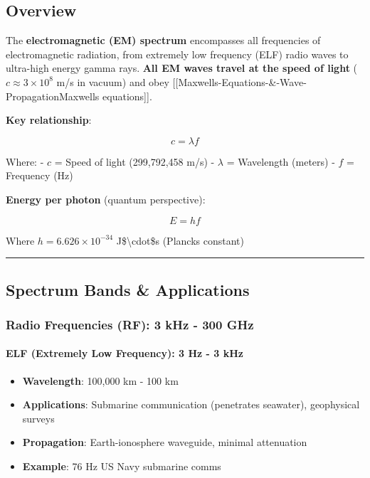 \subsection{Overview}\label{overview}

The \textbf{electromagnetic (EM) spectrum} encompasses all frequencies
of electromagnetic radiation, from extremely low frequency (ELF) radio
waves to ultra-high energy gamma rays. \textbf{All EM waves travel at
the speed of light} (\(c \approx 3 \times 10^8\) m/s in vacuum) and obey
{[}{[}Maxwell\textquotesingle s-Equations-\&-Wave-Propagation\textbar Maxwell\textquotesingle s
equations{]}{]}.

\textbf{Key relationship}:

\[
c = \lambda f
\]

Where: - \(c\) = Speed of light (299,792,458 m/s) - \(\lambda\) =
Wavelength (meters) - \(f\) = Frequency (Hz)

\textbf{Energy per photon} (quantum perspective):

\[
E = h f
\]

Where \(h = 6.626 \times 10^{-34}\) J\$\textbackslash cdot\$s
(Planck\textquotesingle s constant)

\begin{center}\rule{0.5\linewidth}{0.5pt}\end{center}

\subsection{Spectrum Bands \&
Applications}\label{spectrum-bands-applications}

\subsubsection{Radio Frequencies (RF): 3 kHz - 300
GHz}\label{radio-frequencies-rf-3-khz---300-ghz}

\paragraph{\texorpdfstring{\textbf{ELF (Extremely Low Frequency): 3 Hz -
3
kHz}}{ELF (Extremely Low Frequency): 3 Hz - 3 kHz}}\label{elf-extremely-low-frequency-3-hz---3-khz}

\begin{itemize}
\tightlist
\item
  \textbf{Wavelength}: 100,000 km - 100 km
\item
  \textbf{Applications}: Submarine communication (penetrates seawater),
  geophysical surveys
\item
  \textbf{Propagation}: Earth-ionosphere waveguide, minimal attenuation
\item
  \textbf{Example}: 76 Hz US Navy submarine comms
\end{itemize}

